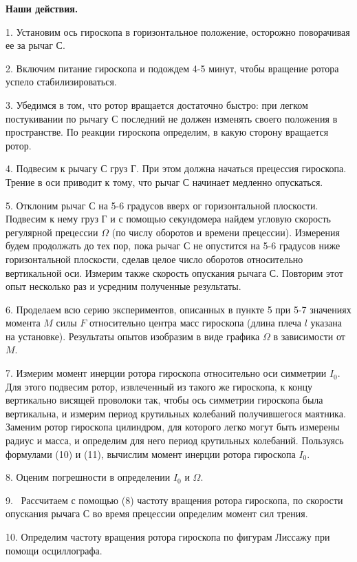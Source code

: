 \documentclass[14pt]{article}
\begin{document}
\vspace{1cm}
\textbf{Наши действия.}
\vspace{1cm}

1. Установим ось гироскопа в горизонтальное положение, осторожно поворачивая ее за рычаг С.

2. Включим питание гироскопа и подождем 4-5 минут, чтобы вращение ротора успело стабилизироваться.

3. Убедимся в том, что ротор вращается достаточно быстро: при легком постукивании по рычагу С последний не должен изменять своего положения в пространстве. По реакции гироскопа определим, в какую сторону вращается ротор.

4. Подвесим к рычагу С груз Г. При этом должна начаться прецессия гироскопа. Трение в оси приводит к тому, что рычаг С начинает медленно опускаться.

5. Отклоним рычаг С на 5-6 градусов вверх ог горизонтальной плоскости. Подвесим к нему груз Г и с помощью секундомера найдем угловую скорость регулярной прецессии $\Omega$ (по числу оборотов и времени прецессии). Измерения будем продолжать до тех пор, пока рычаг С не опустится на 5-6 градусов ниже горизонтальной плоскости, сделав целое число оборотов относительно вертикальной оси. Измерим также скорость опускания рычага С. Повторим этот опыт несколько раз и усредним полученные результаты.

6. Проделаем всю серию экспериментов, описанных в пункте 5 при 5-7 значениях момента $M$ силы $F$ относительно центра масс гироскопа (длина плеча $l$ указана на установке). Результаты опытов изобразим в виде графика $\Omega$ в зависимости от $M$.

7. Измерим момент инерции ротора гироскопа относительно оси симметрии $I_0$. Для этого подвесим ротор, извлеченный из такого же гироскопа, к концу вертикально висящей проволоки так, чтобы ось симметрии гироскопа была вертикальна, и измерим период крутильных колебаний получившегося маятника. Заменим ротор гироскопа цилиндром, для которого легко могут быть измерены радиус и масса, и определим для него период крутильных колебаний. Пользуясь формулами (10) и (11), вычислим момент инерции ротора гироскопа $I_0$.

8. Оценим погрешности в определении $I_0$ и $\Omega$.

9. ~Рассчитаем с помощью (8) частоту вращения ротора гироскопа, по скорости опускания рычага С во время прецессии определим момент сил трения.

10. Определим частоту вращения ротора гироскопа по фигурам Лиссажу при помощи осциллографа.
\end{document}
